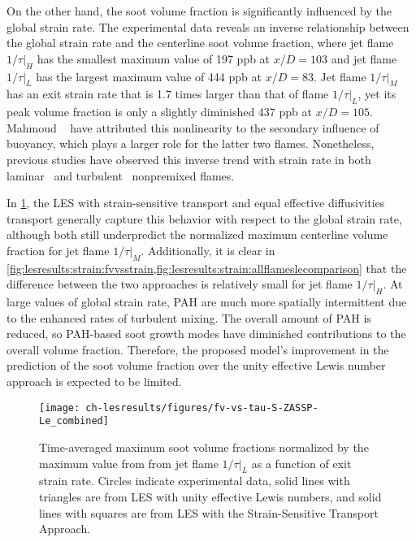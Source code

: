 On the other hand, the soot volume fraction is significantly influenced by the global strain rate. The experimental data reveals an inverse relationship between the global strain rate and the centerline soot volume fraction, where jet flame $1/\tau|_H$ has the smallest maximum value of 197 ppb at $x/D = 103$ and jet flame $1/\tau|_L$ has the largest maximum value of 444 ppb at $x/D = 83$. Jet flame $1/\tau|_M$ has an exit strain rate that is 1.7 times larger than that of flame $1/\tau|_L$, yet its peak volume fraction is only a slightly diminished 437 ppb at $x/D = 105$. Mahmoud \etal~\cite{mahmoud2017} have attributed this nonlinearity to the secondary influence of buoyancy, which plays a larger role for the latter two flames. Nonetheless, previous studies have observed this inverse trend with strain rate in both laminar~\cite{decroix2000,huijnen2010,wang2016433} and turbulent~\cite{kent1984,mahmoud2017} nonpremixed flames.

In \cref{fig:lesresults:strain:fvvsstrain}, the LES with strain-sensitive transport and equal effective diffusivities transport generally capture this behavior with respect to the global strain rate, although both still underpredict the normalized maximum centerline volume fraction for jet flame $1/\tau|_M$. Additionally, it is clear in \cref{fig:lesresults:strain:fvvsstrain,fig:lesresults:strain:allflameslecomparison} that the difference between the two approaches is relatively small for jet flame $1/\tau|_H$. At large values of global strain rate, PAH are much more spatially intermittent due to the enhanced rates of turbulent mixing. The overall amount of PAH is reduced, so PAH-based soot growth modes have diminished contributions to the overall volume fraction. Therefore, the proposed model's improvement in the prediction of the soot volume fraction over the unity effective Lewis number approach is expected to be limited.


\begin{figure}[htb]
  \centering
  \texttt{[image: ch-lesresults/figures/fv-vs-tau-S-ZASSP-Le\_combined]}
  \caption[Normalized Maximum \texorpdfstring{$\langle f_V \rangle$}{<fV>} Versus Exit Strain Rate]{Time-averaged maximum soot volume fractions normalized by the maximum value from from jet flame $1/\tau|_L$ as a function of exit strain rate. Circles indicate experimental data, solid lines with triangles are from LES with unity effective Lewis numbers, and solid lines with squares are from LES with the Strain-Sensitive Transport Approach.}
  \label{fig:lesresults:strain:fvvsstrain}
\end{figure}

